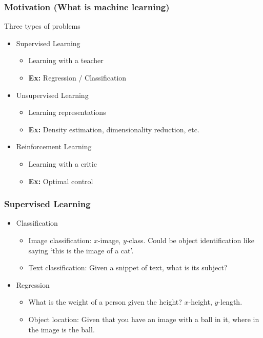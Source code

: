 \documentclass[10pt]{beamer}
\begin{document}
\begin{frame}
	\frametitle{Motivation (What is machine learning)}
	Three types of problems
	\begin{itemize}
		\item Supervised Learning
		\begin{itemize}
			\item Learning with a teacher
			\item {\bf Ex: }Regression / Classification
		\end{itemize}
		\pause
		\item Unsupervised Learning
		\begin{itemize}
			\item Learning representations
			\item {\bf Ex: }Density estimation, dimensionality reduction, etc.
		\end{itemize}
		\item Reinforcement Learning
		\begin{itemize}
			\item Learning with a critic
			\item {\bf Ex: }Optimal control
		\end{itemize}
	\end{itemize}
\end{frame}
\begin{frame}
	\frametitle{Supervised Learning}
	\begin{itemize}
		\item Classification
		\begin{itemize}
			\item Image classification: $x$-image, $y$-class. Could be object identification like saying `this is the image of a cat'.
			\item Text classification: Given a snippet of text, what is its subject?
		\end{itemize}
		\pause
		\item Regression
		\begin{itemize}
			\item What is the weight of a person given the height? $x$-height, $y$-length.
			\item Object location: Given that you have an image with a ball in it, where in the image is the ball.
		\end{itemize}
	\end{itemize}
\end{frame}
\end{document}

